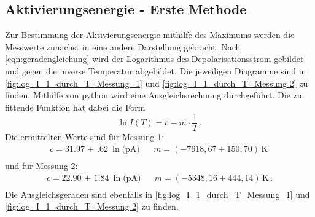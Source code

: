 \subsection{Aktivierungsenergie - Erste Methode}
  Zur Bestimmung der Aktivierungsenergie mithilfe des Maximums werden die Messwerte zunächst in eine andere Darstellung gebracht.
  Nach \eqref{eqn:geradengleichung} wird der Logarithmus des Depolarisationsstrom gebildet und gegen die inverse Temperatur abgebildet.
  Die jeweiligen Diagramme sind in \autoref{fig:log_I_1_durch_T_Messung_1} und \autoref{fig:log_I_1_durch_T_Messung 2} zu finden.
  Mithilfe von python wird eine Ausgleichsrechnung durchgeführt.
  Die zu fittende Funktion hat dabei die Form
  \begin{equation*}
    \ln{I(T)} = c - m \cdot \frac{1}{T} \, .
  \end{equation*}
  Die ermittelten Werte sind für Messung 1:
  \begin{align*}
    c =  \SI{31.97(62)}{\ln(\pico\ampere)} && m = (-7618,67\pm 150,70)\,\si{\kelvin} \,  \\
  \end{align*}
  und für Messung 2:
  \begin{align*}
    c = \SI{22.90(184)}{\ln(\pico\ampere)} && m = (-5348,16\pm 444,14)\,\si{\kelvin}  \, . \\
  \end{align*}
  Die Ausgleichsgeraden sind ebenfalls in \autoref{fig:log_I_1_durch_T_Messung_1} und \autoref{fig:log_I_1_durch_T_Messung 2} zu finden.

